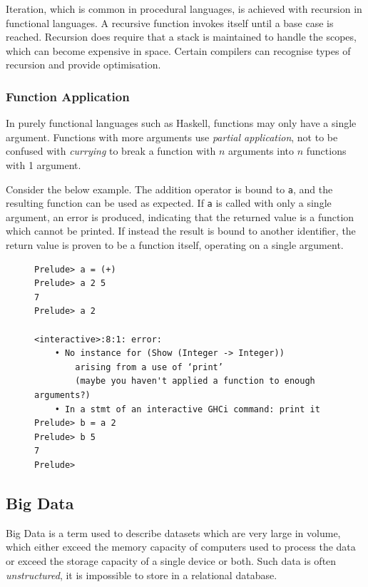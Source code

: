 \documentclass[10pt]{article}
\begin{document}
Iteration, which is common in procedural languages, is achieved with recursion in functional languages. A recursive function invokes itself until a base case is reached. Recursion does require that a stack is maintained to handle the scopes, which can become expensive in space. Certain compilers can recognise types of recursion and provide optimisation.

\subsubsection{Function Application}
\label{sec:org4ee9e61}

In purely functional languages such as Haskell, functions may only have a single argument. Functions with more arguments use \emph{partial application}, not to be confused with \emph{currying} to break a function with \(n\) arguments into \(n\) functions with 1 argument.

Consider the below example. The addition operator is bound to \texttt{a}, and the resulting function can be used as expected. If \texttt{a} is called with only a single argument, an error is produced, indicating that the returned value is a function which cannot be printed. If instead the result is bound to another identifier, the return value is proven to be a function itself, operating on a single argument.

\begin{figure}[H]
\begin{verbatim}
Prelude> a = (+)
Prelude> a 2 5
7
Prelude> a 2

<interactive>:8:1: error:
    • No instance for (Show (Integer -> Integer))
        arising from a use of ‘print’
        (maybe you haven't applied a function to enough arguments?)
    • In a stmt of an interactive GHCi command: print it
Prelude> b = a 2
Prelude> b 5
7
Prelude>
\end{verbatim}
\end{figure}

\subsection{Big Data}
\label{sec:org29fde7a}

Big Data is a term used to describe datasets which are very large in volume, which either exceed the memory capacity of computers used to process the data or exceed the storage capacity of a single device or both. Such data is often \emph{unstructured}, it is impossible to store in a relational database.
\end{document}
